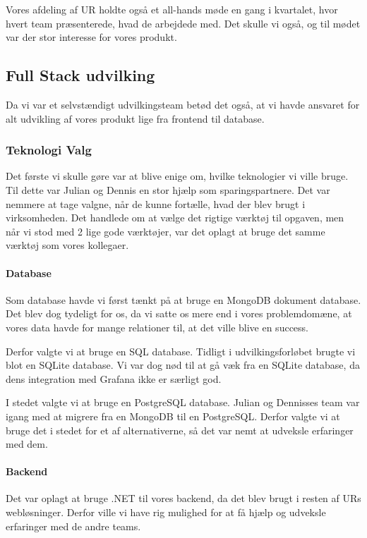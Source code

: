 \documentclass[a4paper]{article}
\begin{document}
Vores afdeling af UR holdte også et all-hands møde en gang i kvartalet,
hvor hvert team præsenterede, hvad de arbejdede med.
Det skulle vi også,
og til mødet var der stor interesse for vores produkt.

\subsection{Full Stack udvilking}
Da vi var et selvstændigt udvilkingsteam betød det også,
at vi havde ansvaret for alt udvikling af vores produkt
lige fra frontend til database.

\subsubsection{Teknologi Valg}
\label{teknologi_valg}
Det første vi skulle gøre var at blive enige om,
hvilke teknologier vi ville bruge.
Til dette var Julian og Dennis en stor hjælp som sparingspartnere.
Det var nemmere at tage valgne,
når de kunne fortælle,
hvad der blev brugt i virksomheden.
Det handlede om at vælge det rigtige værktøj til opgaven,
men når vi stod med 2 lige gode værktøjer,
var det oplagt at bruge det samme værktøj som vores kollegaer.

\paragraph{Database}
Som database havde vi først tænkt på at bruge en MongoDB dokument database.
Det blev dog tydeligt for os, da vi satte os mere end i vores problemdomæne,
at vores data havde for mange relationer til, at det ville blive en success.

Derfor valgte vi at bruge en SQL database.
Tidligt i udvilkingsforløbet brugte vi blot en SQLite database.
Vi var dog nød til at gå væk fra en SQLite database,
da dens integration med Grafana ikke er særligt god.

I stedet valgte vi at bruge en PostgreSQL database.
Julian og Dennisses team var igang med at migrere fra en MongoDB til en PostgreSQL.
Derfor valgte vi at bruge det i stedet for et af alternativerne,
så det var nemt at udveksle erfaringer med dem.

\paragraph{Backend}
Det var oplagt at bruge .NET til vores backend,
da det blev brugt i resten af URs webløsninger.
Derfor ville vi have rig mulighed for at få hjælp
og udveksle erfaringer med de andre teams.
\end{document}
